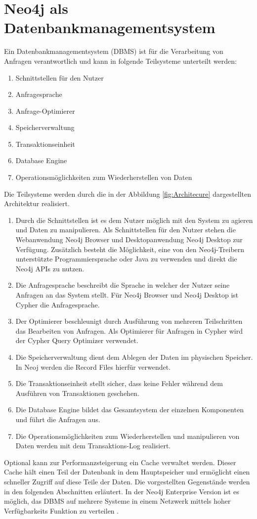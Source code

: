 \section{Neo4j als Datenbankmanagementsystem}
Ein Datenbankmanagementsystem (DBMS) ist für die Verarbeitung von Anfragen verantwortlich und kann in folgende Teilsysteme unterteilt werden\parencite{angles2012comparison}:
\begin{enumerate}
	\item Schnittstellen für den Nutzer
	\item  Anfragesprache
	\item  Anfrage-Optimierer
	\item  Speicherverwaltung
	\item  Transaktionseinheit
	\item  Database Engine
	\item Operationsmöglichkeiten zum Wiederherstellen von Daten
\end{enumerate}
Die Teilsysteme werden durch die in der Abbildung \ref{fig:Architecure} dargestellten Architektur realisiert.
\begin{enumerate}
	\item Durch die Schnittstellen ist es dem Nutzer möglich mit den System zu agieren und Daten zu manipulieren. Als Schnittstellen für den Nutzer stehen die Webanwendung Neo4j Browser und Desktopanwendung Neo4j Desktop zur Verfügung. Zusätzlich besteht die Möglichkeit, eine von den Neo4j-Treibern unterstützte Programmiersprache  oder  Java zu verwenden und direkt die Neo4j APIs zu nutzen. 
	\item
	Die Anfragesprache  beschreibt die Sprache in welcher der Nutzer seine Anfragen an das System stellt. Für Neo4j Browser und Neo4j Desktop ist Cypher die Anfragesprache.
	\item Der Optimierer beschleunigt durch Ausführung von mehreren Teilschritten das Bearbeiten von Anfragen. Als Optimierer für Anfragen in Cypher wird der Cypher Query Optimizer verwendet\parencite{Optimizer}. 
	\item Die Speicherverwaltung dient dem Ablegen der Daten im physischen Speicher. In Neoj werden die Record Files hierfür verwendet.
	\item Die Transaktionseinheit stellt sicher, dass keine Fehler während dem Ausführen von Transaktionen geschehen. 
	\item Die Database Engine bildet das Gesamtsystem der einzelnen Komponenten und führt die Anfragen aus.\item 
	Die Operationsmöglichkeiten zum Wiederherstellen und manipulieren von Daten werden mit dem Transaktions-Log realisiert.
\end{enumerate}
Optional kann zur  Performanzsteigerung ein Cache verwaltet werden. Dieser Cache hält einen Teil der Datenbank in dem Hauptspeicher und ermöglicht einen schneller Zugriff auf diese Teile der Daten. Die vorgestellten Gegenstände werden in den folgenden Abschnitten erläutert. In der Neo4j Enterprise Version ist es möglich, das DBMS auf mehrere Systeme in einem Netzwerk mittels hoher Verfügbarkeits Funktion zu verteilen \parencite{vukotic2015neo4j}.


